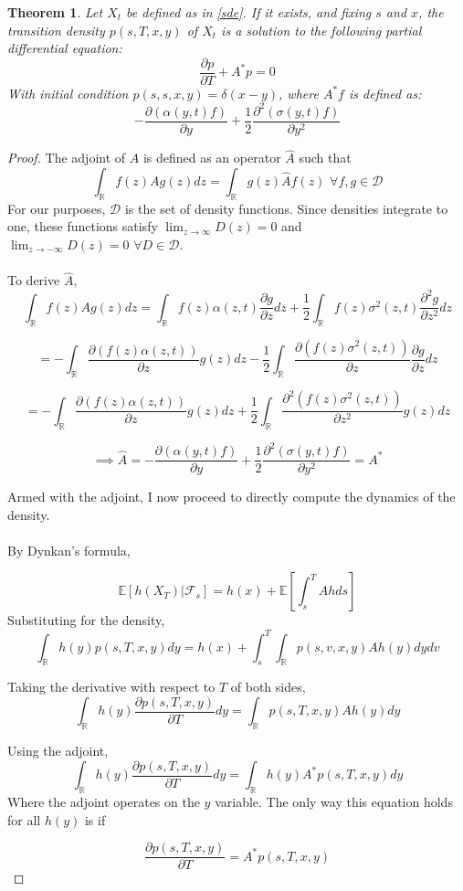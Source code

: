 \documentclass{article}
\newtheorem{theorem}{Theorem}
\theoremstyle{definition}
\begin{document}
\begin{theorem}\label{fk}
	Let \(X_t\) be defined as in \ref{sde}.  If it exists, and fixing \(s\) and \(x\), the transition density \(p(s, T, x, y)\) of \(X_t\) is a solution to the following partial differential equation:
	\[\frac{\partial p}{\partial T} + A^*p=0 \]
	With initial condition \(p(s, s, x, y)=\delta(x-y)\), where \(A^*f\) is defined as: \[-\frac{\partial \left(\alpha(y, t) f\right)}{\partial y} + \frac{1}{2}\frac{\partial^2 \left(\sigma(y, t) f\right) } {\partial y^2}   \]
\end{theorem}
\begin{proof}
	The adjoint of \(A\) is defined as an operator \(\hat{A}\) such that 
	\[\int_\mathbb{R} f(z) A g(z) dz = \int_\mathbb{R} g(z) \hat{A} f(z)\,\,\forall f, g \in \mathcal{D}   \]
	For our purposes, \(\mathcal{D}\) is the set of density functions.  Since densities integrate to one, these functions satisfy \(\lim_{z \to \infty } D(z) =0 \) and \(\lim_{z \to -\infty} D(z)=0\,\,\forall D \in \mathcal{D}\).
	\\
	\\
	To derive \(\hat{A}\),  
	\[\int_\mathbb{R} f(z) A g(z) dz  = \int_\mathbb{R}  f(z)  \alpha(z, t) \frac{\partial g}{\partial z} dz+\frac{1}{2} \int_\mathbb{R} f(z)\sigma^2(z, t) \frac{\partial^2 g}{\partial z^2} dz \]
	
	\[= - \int_\mathbb{R}  \frac{\partial \left( f(z)  \alpha(z, t) \right)}{\partial z} g(z) dz -\frac{1}{2} \int_\mathbb{R} \frac{\partial \left(f(z)\sigma^2(z, t)\right) }{\partial z} \frac{\partial g}{\partial z} dz   \]
	
	\[ = - \int_\mathbb{R}  \frac{\partial \left( f(z)  \alpha(z, t) \right)}{\partial z} g(z) dz +\frac{1}{2} \int_\mathbb{R} \frac{\partial ^2 \left(f(z)\sigma^2(z, t) \right)}{\partial z^2} g(z) dz   \]
	
	
	\[ \implies \hat{A}= -\frac{\partial \left(\alpha(y, t) f\right)}{\partial y} + \frac{1}{2}\frac{\partial^2 \left(\sigma(y, t) f\right) } {\partial y^2} =A^* \]
	
	Armed with the adjoint, I now proceed to directly compute the dynamics of the density.  
	\\
	\\
	By Dynkan's formula,
	
	\[ \mathbb{E}[h(X_T)|\mathcal{F}_s]= h(x)+\mathbb{E}\left[\int_s^T A h ds \right]  \]
	Substituting for the density, 
	\[\int_\mathbb{R} h(y) p(s, T, x, y) dy = h(x)+ \int_s^T  \int_\mathbb{R}p(s, v, x, y) A h(y)   dy dv   \]
	
	Taking the derivative with respect to \(T\) of both sides,
	\[\int_\mathbb{R} h(y) \frac{\partial p(s, T, x, y)}{\partial T} dy = \int_\mathbb{R}  p(s, T, x, y) A h(y) dy   \]
	
	Using the adjoint,
	\[\int_\mathbb{R} h(y) \frac{\partial p(s, T, x, y)}{\partial T} dy= \int_\mathbb{R}  h(y) A^* p(s, T, x, y) dy  \]
	Where the adjoint operates on the \(y\) variable.  The only way this equation holds for all \(h(y)\) is if 
	
	\[\frac{\partial p(s, T, x, y)}{\partial T} = A^* p(s, T, x, y)  \]
	
	
\end{proof}
\end{document}
